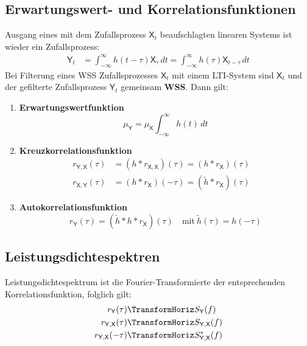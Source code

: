 \documentclass[a4paper,twocolumn,10pt]{article}
\newenvironment{iii}{\begin{enumerate}[label={\roman{*})}]}{\end{enumerate}}
\newcommand{\fa}{\TransformHoriz}
\begin{document}
\subsection{Erwartungswert- und Korrelationsfunktionen}
Ausgang eines mit dem Zufallsprozess $\mathsf{X}_{t}$ beaufschlagten linearen Systems ist wieder ein Zufallsprozess:
\begin{align}
\mathsf{Y}_{t} & = \int_{- \infty}^{\infty} h(t-\tau) \mathsf{X}_{\tau} \, dt = \int_{- \infty}^{\infty} h(\tau) \mathsf{X}_{t-\tau} \, dt \nonumber
\end{align}
Bei Filterung eines WSS Zufallsprozesses $\mathsf{X}_{t}$ mit einem LTI-System sind $\mathsf{X}_{t}$ und der gefilterte Zufallsprozess $\mathsf{Y}_{t}$ gemeinsam \textbf{WSS}. Dann gilt:
\begin{iii}
\item \textbf{Erwartungswertfunktion}
\[ \mu_{\mathsf{Y}} = \mu_{\mathsf{X}} \int_{- \infty}^{\infty} h(t) \, dt \]
\item \textbf{Kreuzkorrelationsfunktion}
\begin{equation*}
\begin{split}
r_{\mathsf{Y,X}}(\tau) &= (h\ast r_{\mathsf{X,X}})(\tau)=(h \ast r_{\mathsf{X}})(\tau) \quad\\
r_{\mathsf{X,Y}}(\tau)&=(h\ast r_{\mathsf{X}})(-\tau)=(\tilde{h}*r_{\mathsf{X}})(\tau)
\end{split}
\end{equation*}
\item \textbf{Autokorrelationsfunktion}
\[ r_{\mathsf{Y}}(\tau) = (\tilde{h} \ast h \ast r_{\mathsf{X}})(\tau) \quad \text{mit} \ \tilde{h}(\tau) = h(- \tau) \]
\end{iii}

\subsection{Leistungsdichtespektren}
Leistungsdichtespektrum ist die Fourier-Transformierte der entsprechenden Korrelationsfunktion, folglich gilt:
\begin{align}
r_{\mathsf{Y}}(\tau) & \fa S_{\mathsf{Y}}(f) \nonumber \\
r_{\mathsf{Y,X}}(\tau) & \fa S_{\mathsf{Y},\mathsf{X}}(f) \nonumber\\
r_{\mathsf{Y,X}}(-\tau) & \fa S^{*}_{\mathsf{Y},\mathsf{X}}(f) \nonumber
\end{align}
\end{document}
